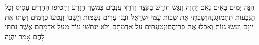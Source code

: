 \documentclass[../main/main.tex]{subfiles}
\begin{document}
\begin{multicols*}{\ncols}
הִנֵּה יָמִים בָּאִים נְאֻם יַהְוֶה וְנִגַּשׁ חוֹרֵשׁ בַּקֹּצֵר וְדֹרֵךְ עֲנָבִים בְּמֹשֵׁךְ הַזָּרַע וְהִטִּיפוּ הֶהָרִים עָסִיס וְכָל הַגְּבָעוֹת תִּתְמוֹגַגְנָה\PreVerseSpace{}וְשַׁבְתִּי אֶת שְׁבוּת עַמִּי יִשְׂרָאֵל וּבָנוּ עָרִים נְשַׁמּוֹת וְיָשָׁבוּ וְנָטְעוּ כְרָמִים וְשָׁתוּ אֶת יֵינָם וְעָשׂוּ גַנּוֹת וְאָכְלוּ אֶת פְּרִיהֶם\PreVerseSpace{}וּנְטַעְתִּים עַל אַדְמָתָם וְלֹא יִנָּתְשׁוּ עוֹד מֵעַל אַדְמָתָם אֲשֶׁר נָתַתִּי לָהֶם אָמַר יַהְוֶה\par
\end{multicols*}
\end{document}
